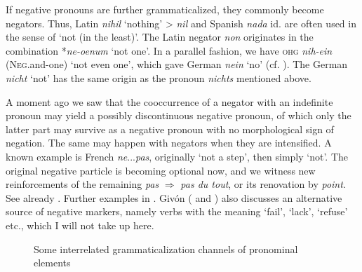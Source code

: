 If negative pronouns are further grammaticalized, they commonly become negators. Thus, Latin \textit{nihil} ‘nothing’ {\textgreater} \textit{nil} and Spanish \textit{nada} id. are often used in the sense of ‘not (in the least)’. The Latin negator \textit{non} originates in the combination *\textit{ne-oenum} ‘not one’. In a parallel fashion, we have \textsc{ohg} \textit{nih-ein} (\textsc{Neg}.and-one) ‘not even one’, which gave German \textit{nein} ‘no’ (cf. \citealt[140]{Meillet1912}). The German \textit{nicht} ‘not’ has the same origin as the pronoun \textit{nichts} mentioned above.

A moment ago we saw that the cooccurrence of a negator with an indefinite pronoun may yield a possibly discontinuous negative pronoun, of which only the latter part may survive as a negative pronoun with no morphological sign of negation. The same may happen with negators when they are intensified. A known example is French \textit{ne}...\textit{pas}, originally ‘not a step’, then simply ‘not’. The original negative particle is becoming optional now, and we witness new reinforcements of the remaining \textit{pas} $\Rightarrow $ \textit{pas du tout}, or its renovation by \textit{point}. See already \citet[140]{Meillet1912}. Further examples in \citet[204]{Givón1979a}. Givón (\citeyear[204]{Givón1979a} and \citeyear[917]{Givón1973}) also discusses an alternative source of negative markers, namely verbs with the meaning ‘fail’, ‘lack’, ‘refuse’ etc., which I will not take up here.


\begin{figure}
	\caption{Some interrelated grammaticalization channels of pronominal elements} \label{interrelatedpronomel}
\end{figure}

